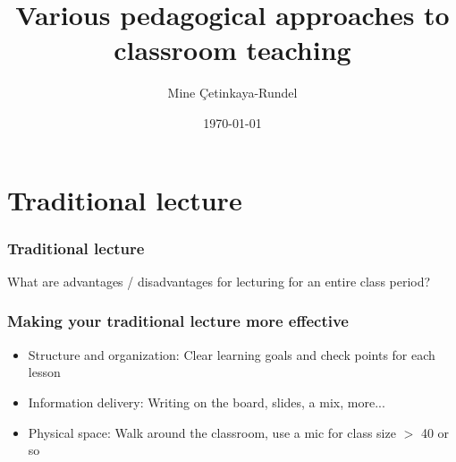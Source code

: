 \documentclass{beamer}
\title{Various pedagogical approaches to classroom teaching}
\date{\today}
\author{Mine \c{C}etinkaya-Rundel}
\institute{Sta 771S - Teaching Statistics}
\begin{document}
\maketitle
 
 

\section{Traditional lecture}


\begin{frame}
\frametitle{Traditional lecture}

\vfill

\alert{
What are advantages / disadvantages for lecturing for an entire class period?
}

\vfill

\end{frame}


\begin{frame}
\frametitle{Making your traditional lecture more effective}

\begin{itemize}

\item Structure and organization: Clear learning goals and check points for each lesson

\pause

\item Information delivery: Writing on the board, slides, a mix, more...

\pause

\item Physical space: Walk around the classroom, use a mic for class size $>$ 40 or so

\end{itemize}

\end{frame}

\end{document}
